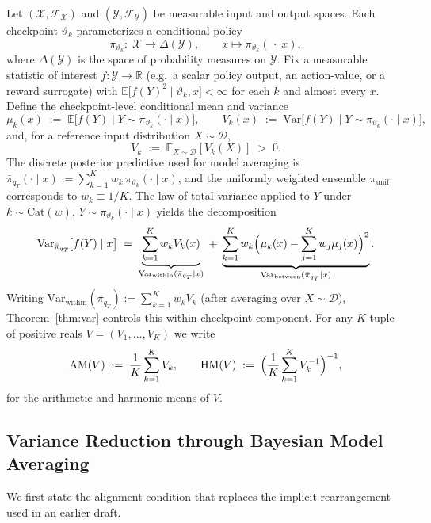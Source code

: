 \documentclass[10pt]{article}
\theoremstyle{plain}
\theoremstyle{definition}
\theoremstyle{remark}
\newcommand{\E}{\mathbb{E}}
\newcommand{\Var}{\mathrm{Var}}
\newcommand{\HM}{\mathrm{HM}}
\newcommand{\AM}{\mathrm{AM}}
\begin{document}
Let $(\mathcal{X},\mathcal{F}_\mathcal{X})$ and $(\mathcal{Y},\mathcal{F}_\mathcal{Y})$ be measurable input and output spaces. Each checkpoint $\vartheta_k$ parameterizes a conditional policy
\[
\pi_{\vartheta_k}:\; \mathcal{X} \to \Delta(\mathcal{Y}), \qquad x \mapsto \pi_{\vartheta_k}(\,\cdot\mid x),
\]
where $\Delta(\mathcal{Y})$ is the space of probability measures on $\mathcal{Y}$. Fix a measurable statistic of interest $f:\mathcal{Y}\to\mathbb{R}$ (e.g.\ a scalar policy output, an action-value, or a reward surrogate) with $\E\bigl[f(Y)^2 \mid \vartheta_k, x\bigr] < \infty$ for each $k$ and almost every $x$. Define the checkpoint-level conditional mean and variance
\[
\mu_k(x) \;:=\; \E\bigl[f(Y)\mid Y\sim\pi_{\vartheta_k}(\cdot\mid x)\bigr], \qquad
V_k(x) \;:=\; \Var\bigl[f(Y)\mid Y\sim\pi_{\vartheta_k}(\cdot\mid x)\bigr],
\]
and, for a reference input distribution $X\sim\mathcal{D}$,
\[
V_k \;:=\; \E_{X\sim\mathcal{D}}[V_k(X)] \;>\; 0.
\]
The discrete posterior predictive used for model averaging is $\bar{\pi}_{q_T}(\cdot\mid x) := \sum_{k=1}^K w_k\,\pi_{\vartheta_k}(\cdot\mid x)$, and the uniformly weighted ensemble $\pi_{\mathrm{unif}}$ corresponds to $w_k\equiv 1/K$. The law of total variance applied to $Y$ under $k\sim\mathrm{Cat}(w)$, $Y\sim\pi_{\vartheta_k}(\cdot\mid x)$ yields the decomposition
\begin{equation}\label{eq:lotv}
\Var_{\bar{\pi}_{q_T}}\!\bigl[f(Y)\mid x\bigr] \;=\;
\underbrace{\sum_{k=1}^K w_k V_k(x)}_{\Var_{\mathrm{within}}(\bar{\pi}_{q_T}\mid x)}
\;+\;
\underbrace{\sum_{k=1}^K w_k \Bigl(\mu_k(x) - \sum_{j=1}^K w_j \mu_j(x)\Bigr)^{2}}_{\Var_{\mathrm{between}}(\bar{\pi}_{q_T}\mid x)}.
\end{equation}
Writing $\Var_{\mathrm{within}}(\bar{\pi}_{q_T}) := \sum_{k=1}^K w_k V_k$ (after averaging over $X\sim\mathcal{D}$), Theorem~\ref{thm:var} controls this within-checkpoint component. For any $K$-tuple of positive reals $V = (V_1,\ldots,V_K)$ we write
\[
\AM(V) \;:=\; \frac{1}{K}\sum_{k=1}^K V_k, \qquad
\HM(V) \;:=\; \Bigl(\frac{1}{K}\sum_{k=1}^K V_k^{-1}\Bigr)^{-1},
\]
for the arithmetic and harmonic means of $V$.

\subsection{Variance Reduction through Bayesian Model Averaging}

We first state the alignment condition that replaces the implicit rearrangement used in an earlier draft.
\end{document}
